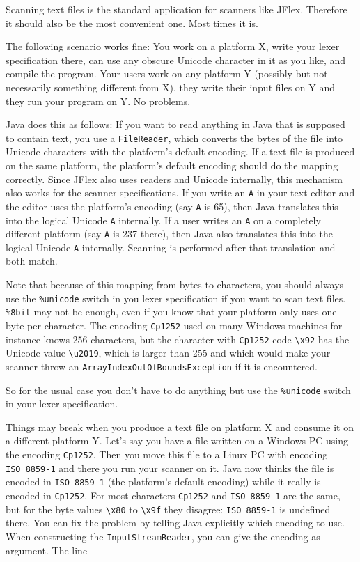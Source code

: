 Scanning text files is the standard application for scanners like JFlex.
Therefore it should also be the most convenient one. Most times it is.

The following scenario works fine: You work on a platform X, write your
lexer specification there, can use any obscure Unicode character in it
as you like, and compile the program. Your users work on any platform Y
(possibly but not necessarily something different from X), they write
their input files on Y and they run your program on Y. No problems.

Java does this as follows: If you want to read anything in Java that is
supposed to contain text, you use a \texttt{FileReader}, which converts
the bytes of the file into Unicode characters with the platform's
default encoding. If a text file is produced on the same platform, the
platform's default encoding should do the mapping correctly. Since JFlex
also uses readers and Unicode internally, this mechanism also works for
the scanner specifications. If you write an \texttt{A} in your text
editor and the editor uses the platform's encoding (say \texttt{A} is
65), then Java translates this into the logical Unicode \texttt{A}
internally. If a user writes an \texttt{A} on a completely different
platform (say \texttt{A} is 237 there), then Java also translates this
into the logical Unicode \texttt{A} internally. Scanning is performed
after that translation and both match.

Note that because of this mapping from bytes to characters, you should
always use the \texttt{\%unicode} switch in you lexer specification if
you want to scan text files. \texttt{\%8bit} may not be enough, even if
you know that your platform only uses one byte per character. The
encoding \texttt{Cp1252} used on many Windows machines for instance
knows 256 characters, but the character \texttt{\textquotesingle{}} with
\texttt{Cp1252} code \texttt{\textbackslash{}x92} has the Unicode value
\texttt{\textbackslash{}u2019}, which is larger than 255 and which would
make your scanner throw an \texttt{ArrayIndexOutOfBoundsException} if it
is encountered.

So for the usual case you don't have to do anything but use the
\texttt{\%unicode} switch in your lexer specification.

Things may break when you produce a text file on platform X and consume
it on a different platform Y. Let's say you have a file written on a
Windows PC using the encoding \texttt{Cp1252}. Then you move this file
to a Linux PC with encoding \texttt{ISO\ 8859-1} and there you run your
scanner on it. Java now thinks the file is encoded in
\texttt{ISO\ 8859-1} (the platform's default encoding) while it really
is encoded in \texttt{Cp1252}. For most characters \texttt{Cp1252} and
\texttt{ISO\ 8859-1} are the same, but for the byte values
\texttt{\textbackslash{}x80} to \texttt{\textbackslash{}x9f} they
disagree: \texttt{ISO\ 8859-1} is undefined there. You can fix the
problem by telling Java explicitly which encoding to use. When
constructing the \texttt{InputStreamReader}, you can give the encoding
as argument. The line

